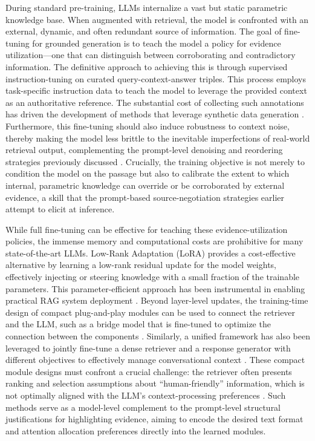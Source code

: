 \documentclass[11pt,a4paper]{article}
\begin{document}
During standard pre-training, LLMs internalize a vast but static parametric knowledge base. When augmented with retrieval, the model is confronted with an external, dynamic, and often redundant source of information. The goal of fine-tuning for grounded generation is to teach the model a policy for evidence utilization---one that can distinguish between corroborating and contradictory information. The definitive approach to achieving this is through supervised instruction-tuning on curated query-context-answer triples. This process employs task-specific instruction data to teach the model to leverage the provided context as an authoritative reference. The substantial cost of collecting such annotations has driven the development of methods that leverage synthetic data generation \cite{arxiv:2306.05212v1}. Furthermore, this fine-tuning should also induce robustness to context noise, thereby making the model less brittle to the inevitable imperfections of real-world retrieval output, complementing the prompt-level denoising and reordering strategies previously discussed \cite{arxiv:2401.14887v3}. Crucially, the training objective is not merely to condition the model on the passage but also to calibrate the extent to which internal, parametric knowledge can override or be corroborated by external evidence, a skill that the prompt-based source-negotiation strategies earlier attempt to elicit at inference.

While full fine-tuning can be effective for teaching these evidence-utilization policies, the immense memory and computational costs are prohibitive for many state-of-the-art LLMs. Low-Rank Adaptation (LoRA) provides a cost-effective alternative by learning a low-rank residual update for the model weights, effectively injecting or steering knowledge with a small fraction of the trainable parameters. This parameter-efficient approach has been instrumental in enabling practical RAG system deployment \cite{arxiv:2404.10981v1}. Beyond layer-level updates, the training-time design of compact plug-and-play modules can be used to connect the retriever and the LLM, such as a bridge model that is fine-tuned to optimize the connection between the components \cite{arxiv:2401.06954v2}. Similarly, a unified framework has also been leveraged to jointly fine-tune a dense retriever and a response generator with different objectives to effectively manage conversational context \cite{arxiv:2507.07030v1}. These compact module designs must confront a crucial challenge: the retriever often presents ranking and selection assumptions about ``human-friendly'' information, which is not optimally aligned with the LLM's context-processing preferences \cite{arxiv:2401.06954v2}. Such methods serve as a model-level complement to the prompt-level structural justifications for highlighting evidence, aiming to encode the desired text format and attention allocation preferences directly into the learned modules.
\end{document}
